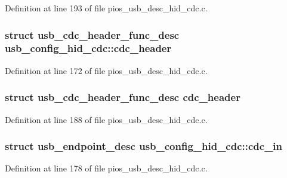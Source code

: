 \-Definition at line 193 of file pios\-\_\-usb\-\_\-desc\-\_\-hid\-\_\-cdc.\-c.

\hypertarget{group___p_i_o_s___u_s_b___d_e_s_c_gaedeb1a14bf5f0cfea7d70e97389205c8}{
\subsubsection[{cdc\-\_\-header}]{\setlength{\rightskip}{0pt plus 5cm}struct {\bf usb\-\_\-cdc\-\_\-header\-\_\-func\-\_\-desc} {\bf usb\-\_\-config\-\_\-hid\-\_\-cdc\-::cdc\-\_\-header}}}\label{group___p_i_o_s___u_s_b___d_e_s_c_gaedeb1a14bf5f0cfea7d70e97389205c8}


\-Definition at line 172 of file pios\-\_\-usb\-\_\-desc\-\_\-hid\-\_\-cdc.\-c.

\hypertarget{group___p_i_o_s___u_s_b___d_e_s_c_gaf41f2d1d7fbf8850ddc7ca678ca183aa}{
\subsubsection[{cdc\-\_\-header}]{\setlength{\rightskip}{0pt plus 5cm}struct {\bf usb\-\_\-cdc\-\_\-header\-\_\-func\-\_\-desc} {\bf cdc\-\_\-header}}}\label{group___p_i_o_s___u_s_b___d_e_s_c_gaf41f2d1d7fbf8850ddc7ca678ca183aa}


\-Definition at line 188 of file pios\-\_\-usb\-\_\-desc\-\_\-hid\-\_\-cdc.\-c.

\hypertarget{group___p_i_o_s___u_s_b___d_e_s_c_ga599b79ff75341552732decb7763cc6c8}{
\subsubsection[{cdc\-\_\-in}]{\setlength{\rightskip}{0pt plus 5cm}struct {\bf usb\-\_\-endpoint\-\_\-desc} {\bf usb\-\_\-config\-\_\-hid\-\_\-cdc\-::cdc\-\_\-in}}}\label{group___p_i_o_s___u_s_b___d_e_s_c_ga599b79ff75341552732decb7763cc6c8}


\-Definition at line 178 of file pios\-\_\-usb\-\_\-desc\-\_\-hid\-\_\-cdc.\-c.

